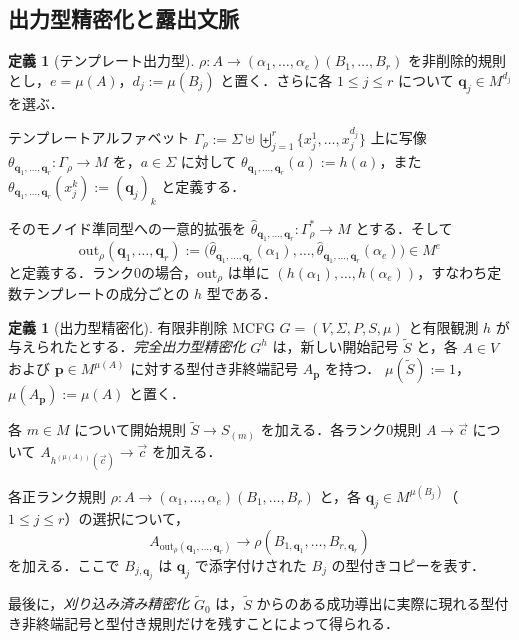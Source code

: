\documentclass[11pt,a4paper]{ltjsarticle}
\numberwithin{equation}{section}
\theoremstyle{plain}
\theoremstyle{definition}
\newtheorem{definition}[theorem]{定義}
\theoremstyle{remark}
\newcommand{\out}{\mathrm{out}}
\newcommand{\tuple}[1]{\vec{#1}}
\begin{document}
\subsection{出力型精密化と露出文脈}
\label{sec:refinement}

\begin{definition}[テンプレート出力型]
\label{def:output-map}
\(\rho:A\to(\alpha_1,\ldots,\alpha_e)(B_1,\ldots,B_r)\)
を非削除的規則とし，\(e=\mu(A)\)，\(d_j:=\mu(B_j)\) と置く．さらに各 \(1\le j\le r\) について \(\mathbf q_j\in M^{d_j}\) を選ぶ．

テンプレートアルファベット
\(
  \Gamma_\rho
  :=\Sigma\uplus\biguplus_{j=1}^r
  \{x_j^1,\ldots,x_j^{d_j}\}
\)
上に写像
\(\theta_{\mathbf q_1,\ldots,\mathbf q_r}\colon\Gamma_\rho\to M\)
を，\(a\in\Sigma\) に対して
\(\theta_{\mathbf q_1,\ldots,\mathbf q_r}(a):=h(a)\)，また
\(\theta_{\mathbf q_1,\ldots,\mathbf q_r}(x_j^k):=(\mathbf q_j)_k\)
と定義する．

そのモノイド準同型への一意的拡張を
\(
  \widehat\theta_{\mathbf q_1,\ldots,\mathbf q_r}
  \colon\Gamma_\rho^*\to M
\)
とする．そして
\[
  \out_\rho(\mathbf q_1,\ldots,\mathbf q_r)
  :=
  \bigl(
    \widehat\theta_{\mathbf q_1,\ldots,\mathbf q_r}(\alpha_1),
    \ldots,
    \widehat\theta_{\mathbf q_1,\ldots,\mathbf q_r}(\alpha_e)
  \bigr)
  \in M^e
\]
と定義する．ランク0の場合，\(\out_\rho\) は単に
\((h(\alpha_1),\ldots,h(\alpha_e))\)，すなわち定数テンプレートの成分ごとの \(h\) 型である．
\end{definition}

\begin{definition}[出力型精密化]
\label{def:output-refinement}
有限非削除 MCFG \(G=(V,\Sigma,P,S,\mu)\) と有限観測 \(h\) が与えられたとする．\emph{完全出力型精密化} \(G^h\) は，新しい開始記号 \(\widetilde S\) と，各 \(A\in V\) および \(\mathbf p\in M^{\mu(A)}\) に対する型付き非終端記号 \(A_{\mathbf p}\) を持つ．
\(\mu(\widetilde S):=1\)，\(\mu(A_{\mathbf p}):=\mu(A)\) と置く．

各 \(m\in M\) について開始規則
\(\widetilde S\to S_{(m)}\)
を加える．各ランク0規則 \(A\to\tuple c\) について
\(A_{h^{(\mu(A))}(\tuple c)}\to\tuple c\)
を加える．

各正ランク規則
\(\rho:A\to(\alpha_1,\ldots,\alpha_e)(B_1,\ldots,B_r)\)
と，各 \(\mathbf q_j\in M^{\mu(B_j)}\)（\(1\le j\le r\)）の選択について，
\[
  A_{\out_\rho(\mathbf q_1,\ldots,\mathbf q_r)}
  \to
  \rho(B_{1,\mathbf q_1},\ldots,B_{r,\mathbf q_r})
\]
を加える．ここで \(B_{j,\mathbf q_j}\) は \(\mathbf q_j\) で添字付けされた \(B_j\) の型付きコピーを表す．

最後に，\emph{刈り込み済み精密化} \(\widetilde G_0\) は，\(\widetilde S\) からのある成功導出に実際に現れる型付き非終端記号と型付き規則だけを残すことによって得られる．
\end{definition}
\end{document}
